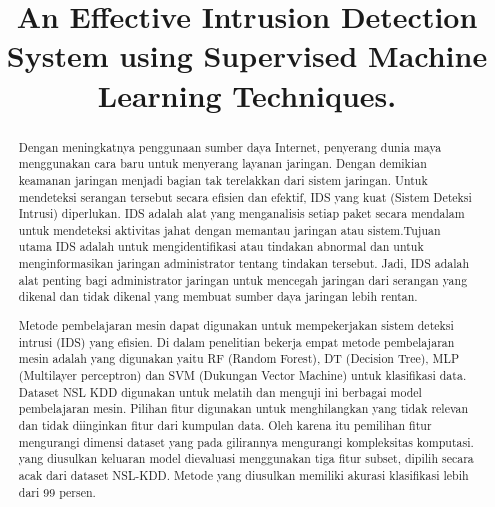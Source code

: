 \documentclass[conference]{IEEEtran}
\begin{document}
\title{An Effective Intrusion Detection System using 
Supervised Machine Learning Techniques.\\
}

\author{
}

\maketitle

\begin{abstract}
Dengan meningkatnya penggunaan sumber daya Internet, penyerang dunia maya menggunakan cara baru untuk menyerang layanan jaringan. Dengan demikian keamanan jaringan menjadi bagian tak terelakkan dari sistem jaringan. Untuk mendeteksi serangan tersebut secara efisien dan efektif, IDS yang kuat (Sistem Deteksi Intrusi) diperlukan. IDS adalah alat yang menganalisis setiap paket secara mendalam untuk mendeteksi aktivitas jahat dengan memantau jaringan atau sistem.Tujuan utama IDS adalah untuk mengidentifikasi atau tindakan abnormal dan untuk menginformasikan jaringan administrator tentang tindakan tersebut. Jadi, IDS adalah alat penting bagi administrator jaringan untuk mencegah jaringan dari serangan yang dikenal dan tidak dikenal yang membuat sumber daya jaringan lebih rentan. 

Metode pembelajaran mesin dapat digunakan untuk mempekerjakan sistem deteksi intrusi (IDS) yang efisien. Di dalam penelitian bekerja empat metode pembelajaran mesin adalah yang digunakan yaitu RF (Random Forest), DT (Decision Tree), MLP (Multilayer perceptron) dan SVM (Dukungan Vector Machine) untuk klasifikasi data. Dataset NSL KDD digunakan untuk melatih dan menguji ini berbagai model pembelajaran mesin. Pilihan fitur digunakan untuk menghilangkan yang tidak relevan dan tidak diinginkan fitur dari kumpulan data. Oleh karena itu pemilihan fitur mengurangi dimensi dataset yang pada gilirannya mengurangi kompleksitas komputasi. yang diusulkan keluaran model dievaluasi menggunakan tiga fitur subset, dipilih secara acak dari dataset NSL-KDD. Metode yang diusulkan memiliki akurasi klasifikasi lebih dari 99 persen.
\end{abstract}
\end{document}
